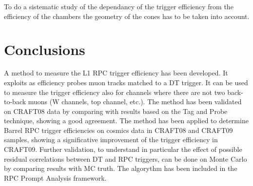 To do a sistematic  study of the  dependancy of the trigger efficiency 
from the efficiency of the chambers the geometry of the  cones  
has to be taken into account.

\section{Conclusions}
A method to measure the L1 RPC trigger efficiency has been developed.
It exploits as efficiency probes muon tracks matched to a DT trigger. 
It can be used to measure the trigger efficiency also for channels where 
there are not two back-to-back muons (W channels, top channel, etc.).
The method has been validated on CRAFT08 data by comparing with results 
based on the Tag and Probe technique, showing a good agreement.
The method has been applied to determine Barrel RPC trigger efficiencies 
on cosmics data in CRAFT08 and CRAFT09 samples, showing a significative 
improvement of the trigger efficiency in CRAFT09.
Further validation, to understand in particular the effect of possible 
residual correlations between DT and RPC triggers, can be done on Monte Carlo 
by comparing results with MC truth.
The algorythm has been included in the RPC Prompt Analysis framework.



